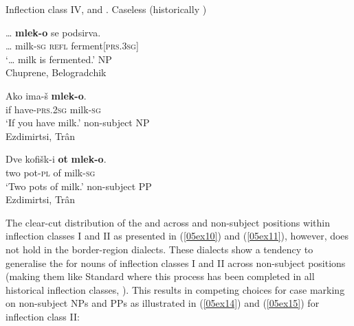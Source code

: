 \documentclass[output=paper,colorlinks,citecolor=brown]{langscibook}
\begin{document}
\newpage

Inflection class IV,  and . Caseless (historically )

\begin{exe}
	\ex \label{05ex13}
	\begin{xlist}
		\ex 
		\gll … \textbf{mlek-o} se podsirva. \\
		… milk-\textsc{sg} \textsc{refl} ferment[\textsc{prs.3sg}] \\
		\trans ‘… milk is fermented.’ \hfill {} NP \\
		\hfill Chuprene, Belogradchik
		
		\ex 
		\gll Ako ima-š \textbf{mlek-o}. \\
		if have-\textsc{prs.2sg} milk-\textsc{sg} \\
		\trans ‘If you have milk.’ \hfill non-subject NP \\
		\hfill Ezdimirtsi, Trân
		
		\ex 
		\gll Dve kofišk-i \textbf{ot} \textbf{mlek-o}. \\
		two pot-\textsc{pl} of milk-\textsc{sg} \\
		\trans ‘Two pots of milk.’ \hfill non-subject PP \\
		\hfill Ezdimirtsi, Trân
	\end{xlist}
\end{exe}

The clear-cut distribution of the  and  across  and non-subject positions within inflection classes I and II as presented in (\ref{05ex10}) and (\ref{05ex11}), however, does not hold in the border-region dialects. These dialects show a tendency to generalise the  for nouns of inflection classes I and II across non-subject positions (making them like Standard  where this process has been completed in all historical inflection classes, \citealt[146--147]{mircev1958}). This results in competing choices for case marking on non-subject NPs and PPs as illustrated in (\ref{05ex14}) and (\ref{05ex15}) for inflection class II:
\end{document}
